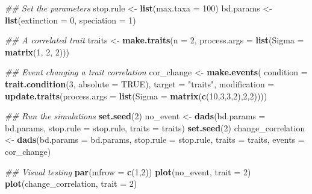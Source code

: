 \documentclass[]{book}
\newenvironment{Shaded}{\begin{snugshade}}{\end{snugshade}}
\newcommand{\CommentTok}[1]{\textcolor[rgb]{0.56,0.35,0.01}{\textit{#1}}}
\newcommand{\DataTypeTok}[1]{\textcolor[rgb]{0.13,0.29,0.53}{#1}}
\newcommand{\DecValTok}[1]{\textcolor[rgb]{0.00,0.00,0.81}{#1}}
\newcommand{\KeywordTok}[1]{\textcolor[rgb]{0.13,0.29,0.53}{\textbf{#1}}}
\newcommand{\NormalTok}[1]{#1}
\newcommand{\OtherTok}[1]{\textcolor[rgb]{0.56,0.35,0.01}{#1}}
\newcommand{\StringTok}[1]{\textcolor[rgb]{0.31,0.60,0.02}{#1}}
\begin{document}
\begin{Shaded}
\begin{Highlighting}[]
\CommentTok{## Set the parameters}
\NormalTok{stop.rule <-}\StringTok{ }\KeywordTok{list}\NormalTok{(}\DataTypeTok{max.taxa =} \DecValTok{100}\NormalTok{)}
\NormalTok{bd.params <-}\StringTok{ }\KeywordTok{list}\NormalTok{(}\DataTypeTok{extinction =} \DecValTok{0}\NormalTok{, }\DataTypeTok{speciation =} \DecValTok{1}\NormalTok{)}

\CommentTok{## A correlated trait}
\NormalTok{traits <-}\StringTok{ }\KeywordTok{make.traits}\NormalTok{(}\DataTypeTok{n =} \DecValTok{2}\NormalTok{, }\DataTypeTok{process.args =} \KeywordTok{list}\NormalTok{(}\DataTypeTok{Sigma =} \KeywordTok{matrix}\NormalTok{(}\DecValTok{1}\NormalTok{, }\DecValTok{2}\NormalTok{, }\DecValTok{2}\NormalTok{)))}

\CommentTok{## Event changing a trait correlation}
\NormalTok{cor_change <-}\StringTok{ }\KeywordTok{make.events}\NormalTok{(}
    \DataTypeTok{condition    =} \KeywordTok{trait.condition}\NormalTok{(}\DecValTok{3}\NormalTok{, }\DataTypeTok{absolute =} \OtherTok{TRUE}\NormalTok{),}
    \DataTypeTok{target       =} \StringTok{"traits"}\NormalTok{,}
    \DataTypeTok{modification =} \KeywordTok{update.traits}\NormalTok{(}\DataTypeTok{process.args =} \KeywordTok{list}\NormalTok{(}\DataTypeTok{Sigma =} \KeywordTok{matrix}\NormalTok{(}\KeywordTok{c}\NormalTok{(}\DecValTok{10}\NormalTok{,}\DecValTok{3}\NormalTok{,}\DecValTok{3}\NormalTok{,}\DecValTok{2}\NormalTok{),}\DecValTok{2}\NormalTok{,}\DecValTok{2}\NormalTok{))))}

\CommentTok{## Run the simulations}
\KeywordTok{set.seed}\NormalTok{(}\DecValTok{2}\NormalTok{)}
\NormalTok{no_event <-}\StringTok{ }\KeywordTok{dads}\NormalTok{(}\DataTypeTok{bd.params =}\NormalTok{ bd.params,}
                 \DataTypeTok{stop.rule =}\NormalTok{ stop.rule,}
                 \DataTypeTok{traits    =}\NormalTok{ traits)}
\KeywordTok{set.seed}\NormalTok{(}\DecValTok{2}\NormalTok{)}
\NormalTok{change_correlation <-}\StringTok{ }\KeywordTok{dads}\NormalTok{(}\DataTypeTok{bd.params =}\NormalTok{ bd.params,}
                           \DataTypeTok{stop.rule =}\NormalTok{ stop.rule,}
                           \DataTypeTok{traits    =}\NormalTok{ traits,}
                           \DataTypeTok{events    =}\NormalTok{ cor_change)}

\CommentTok{## Visual testing}
\KeywordTok{par}\NormalTok{(}\DataTypeTok{mfrow =} \KeywordTok{c}\NormalTok{(}\DecValTok{1}\NormalTok{,}\DecValTok{2}\NormalTok{))}
\KeywordTok{plot}\NormalTok{(no_event, }\DataTypeTok{trait =} \DecValTok{2}\NormalTok{)}
\KeywordTok{plot}\NormalTok{(change_correlation, }\DataTypeTok{trait =} \DecValTok{2}\NormalTok{)}
\end{Highlighting}
\end{Shaded}
\end{document}
